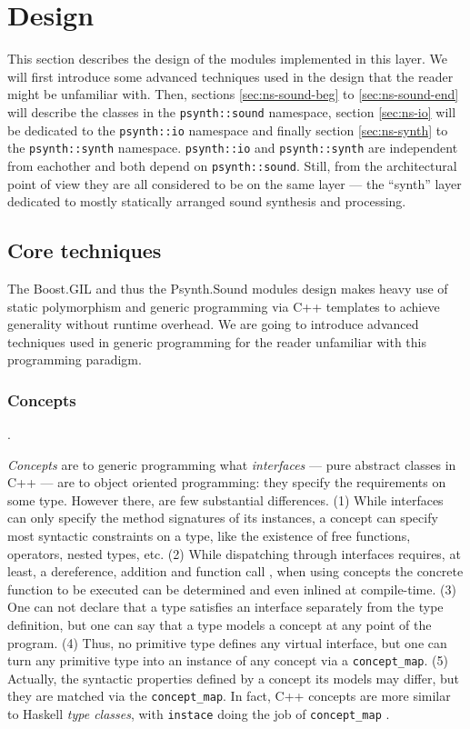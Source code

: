 \section{Design}

This section describes the design of the modules implemented in this
layer. We will first introduce some advanced techniques used in the
design that the reader might be unfamiliar with. Then, sections
\ref{sec:ns-sound-beg} to \ref{sec:ns-sound-end} will describe the
classes in the \texttt{psynth::sound} namespace, section
\ref{sec:ns-io} will be dedicated to the \texttt{psynth::io} namespace
and finally section \ref{sec:ns-synth} to the \texttt{psynth::synth}
namespace. \texttt{psynth::io} and \texttt{psynth::synth} are
independent from eachother and both depend on
\texttt{psynth::sound}. Still, from the architectural point of view
they are all considered to be on the same layer --- the ``synth''
layer dedicated to mostly statically arranged sound synthesis and
processing.

\subsection{Core techniques}

The Boost.GIL and thus the Psynth.Sound modules design makes heavy use
of static polymorphism and generic programming via C++ templates to
achieve generality without runtime overhead. We are going to introduce
advanced techniques used in generic programming for the reader
unfamiliar with this programming paradigm.

\subsubsection{Concepts}
\label{sec:concepts}.

\emph{Concepts} \cite{jarvi10concept} are to generic programming what
\emph{interfaces} --- pure abstract classes in C++ --- are to object
oriented programming: they specify the requirements on some
type. However there, are few substantial differences. (1) While
interfaces can only specify the method signatures of its instances, a
concept can specify most syntactic constraints on a type, like the
existence of free functions, operators, nested types, etc. (2) While
dispatching through interfaces requires, at least, a dereference,
addition and function call \cite{driesen96direct}, when using concepts
the concrete function to be executed can be determined and even
inlined at compile-time. (3) One can not declare that a type satisfies
an interface separately from the type definition, but one can say that
a type models a concept at any point of the program. (4) Thus, no
primitive type defines any virtual interface, but one can turn any
primitive type into an instance of any concept via a
\texttt{concept\_map}. (5) Actually, the syntactic properties defined
by a concept its models may differ, but they are matched via the
\texttt{concept\_map}. In fact, C++ concepts are more similar to
Haskell \emph{type classes}, with \texttt{instace} doing the job of
\texttt{concept\_map} \cite{bernardy08comparison}.

